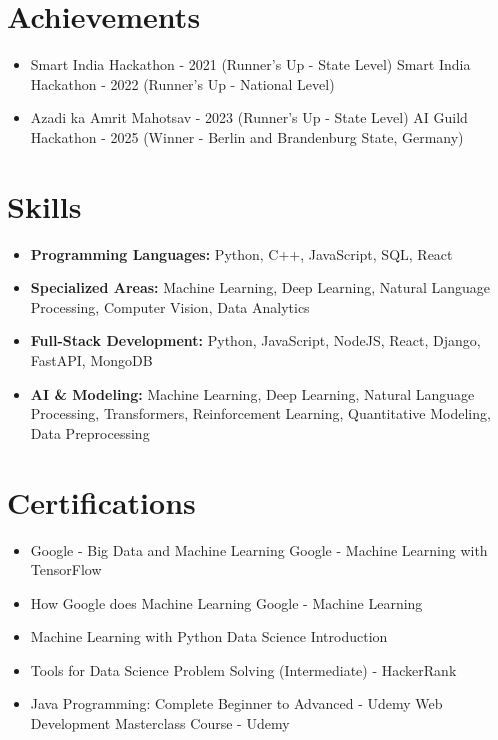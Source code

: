 \documentclass[a4paper,10pt]{article}
\begin{document}
\section*{Achievements}
\begin{itemize}
\item Smart India Hackathon - 2021 (Runner's Up - State Level) \hfill Smart India Hackathon - 2022 (Runner's Up - National Level)
\item Azadi ka Amrit Mahotsav - 2023 (Runner's Up - State Level) \hfill AI Guild Hackathon - 2025 (Winner - Berlin and Brandenburg State, Germany)
\end{itemize}

\section*{Skills}
\begin{itemize}
  \item \textbf{Programming Languages:} Python, C++, JavaScript, SQL, React
  \item \textbf{Specialized Areas:} Machine Learning, Deep Learning, Natural Language Processing, Computer Vision, Data Analytics
  \item \textbf{Full-Stack Development:} Python, JavaScript, NodeJS, React, Django, FastAPI, MongoDB
  \item \textbf{AI \& Modeling:} Machine Learning, Deep Learning, Natural Language Processing, Transformers, Reinforcement Learning, Quantitative Modeling, Data Preprocessing
\end{itemize}

\section*{Certifications}
\begin{itemize}
\item Google - Big Data and Machine Learning \hfill Google - Machine Learning with TensorFlow
\item How Google does Machine Learning \hfill Google - Machine Learning
\item Machine Learning with Python \hfill Data Science Introduction
\item Tools for Data Science \hfill Problem Solving (Intermediate) - HackerRank
\item Java Programming: Complete Beginner to Advanced - Udemy \hfill Web Development Masterclass Course - Udemy
\end{itemize}
\end{document}

